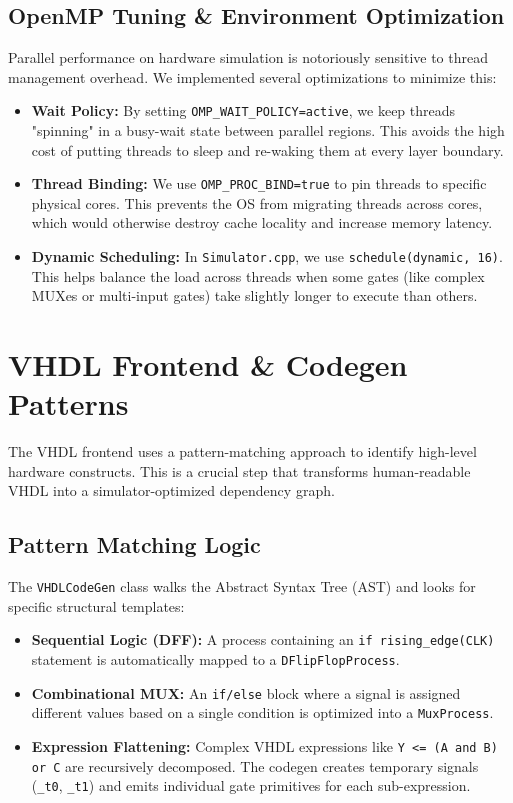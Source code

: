 \documentclass[9pt,a4paper]{article}
\begin{document}
\subsection{OpenMP Tuning \& Environment Optimization}
Parallel performance on hardware simulation is notoriously sensitive to thread management overhead. We implemented several optimizations to minimize this:
\begin{itemize}
    \item \textbf{Wait Policy:} By setting \texttt{OMP\_WAIT\_POLICY=active}, we keep threads "spinning" in a busy-wait state between parallel regions. This avoids the high cost of putting threads to sleep and re-waking them at every layer boundary.
    \item \textbf{Thread Binding:} We use \texttt{OMP\_PROC\_BIND=true} to pin threads to specific physical cores. This prevents the OS from migrating threads across cores, which would otherwise destroy cache locality and increase memory latency.
    \item \textbf{Dynamic Scheduling:} In \texttt{Simulator.cpp}, we use \texttt{schedule(dynamic, 16)}. This helps balance the load across threads when some gates (like complex MUXes or multi-input gates) take slightly longer to execute than others.
\end{itemize}

\section{VHDL Frontend \& Codegen Patterns}

The VHDL frontend uses a pattern-matching approach to identify high-level hardware constructs. This is a crucial step that transforms human-readable VHDL into a simulator-optimized dependency graph.

\subsection{Pattern Matching Logic}
The \texttt{VHDLCodeGen} class walks the Abstract Syntax Tree (AST) and looks for specific structural templates:
\begin{itemize}
    \item \textbf{Sequential Logic (DFF):} A process containing an \texttt{if rising\_edge(CLK)} statement is automatically mapped to a \texttt{DFlipFlopProcess}.
    \item \textbf{Combinational MUX:} An \texttt{if/else} block where a signal is assigned different values based on a single condition is optimized into a \texttt{MuxProcess}.
    \item \textbf{Expression Flattening:} Complex VHDL expressions like \texttt{Y <= (A and B) or C} are recursively decomposed. The codegen creates temporary signals (\texttt{\_t0}, \texttt{\_t1}) and emits individual gate primitives for each sub-expression.
\end{itemize}
\end{document}
